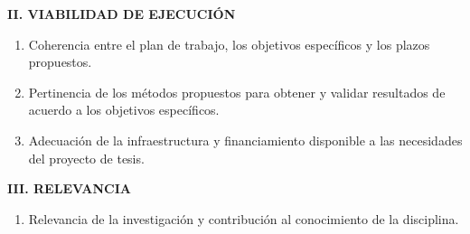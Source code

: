 \documentclass[11pt,letterpaper]{article}
\begin{document}
\textbf{II. VIABILIDAD DE EJECUCIÓN}

\begin{enumerate}
\item Coherencia entre el plan de trabajo, los objetivos específicos y los plazos propuestos. 
\item Pertinencia de los métodos propuestos para obtener y validar resultados de acuerdo a los objetivos específicos.
\item Adecuación de la infraestructura y financiamiento disponible a las necesidades del proyecto de tesis.
\end{enumerate}

\textbf{III. RELEVANCIA}

\begin{enumerate}
\item Relevancia de la investigación y contribución al conocimiento de la disciplina.
\end{enumerate}

\newpage
\end{document}
